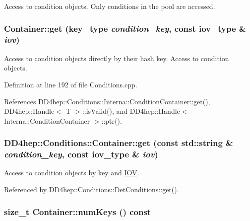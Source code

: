 Access to condition objects. Only conditions in the pool are accessed. \hypertarget{class_d_d4hep_1_1_conditions_1_1_container_a1b9bfc1fd9fbb6953f1b1cf682263cc5}{
\subsubsection[{get}]{ Container::get ({\bf key\_\-type} {\em condition\_\-key}, \/  const {\bf iov\_\-type} \& {\em iov})}}
\label{class_d_d4hep_1_1_conditions_1_1_container_a1b9bfc1fd9fbb6953f1b1cf682263cc5}


Access to condition objects directly by their hash key. Access to condition objects. 

Definition at line 192 of file Conditions.cpp.

References DD4hep::Conditions::Interna::ConditionContainer::get(), DD4hep::Handle$<$ T $>$::isValid(), and DD4hep::Handle$<$ Interna::ConditionContainer $>$::ptr().\hypertarget{class_d_d4hep_1_1_conditions_1_1_container_a7ccceb3f6d41df13376c8c7988ab4735}{
\subsubsection[{get}]{ DD4hep::Conditions::Container::get (const std::string \& {\em condition\_\-key}, \/  const {\bf iov\_\-type} \& {\em iov})}}
\label{class_d_d4hep_1_1_conditions_1_1_container_a7ccceb3f6d41df13376c8c7988ab4735}


Access to condition objects by key and \hyperlink{class_d_d4hep_1_1_i_o_v}{IOV}. 

Referenced by DD4hep::Conditions::DetConditions::get().\hypertarget{class_d_d4hep_1_1_conditions_1_1_container_ad423d94cea1ea683a5279fea77ece42d}{
\subsubsection[{numKeys}]{\setlength{\rightskip}{0pt plus 5cm}size\_\-t Container::numKeys () const}}
\label{class_d_d4hep_1_1_conditions_1_1_container_ad423d94cea1ea683a5279fea77ece42d}


